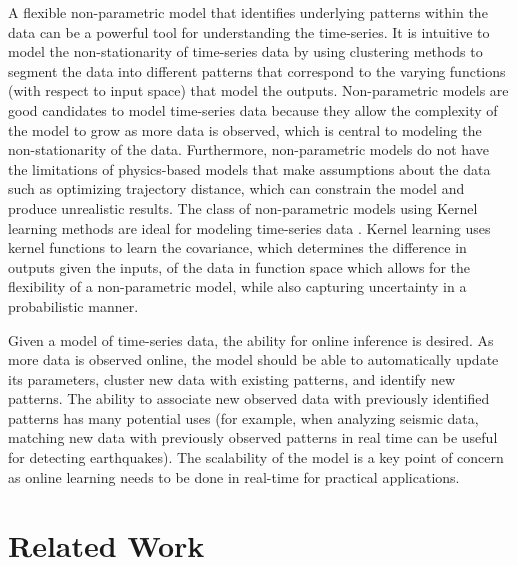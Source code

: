 \documentclass{article}
\begin{document}
A flexible non-parametric model that identifies underlying patterns within the data can be a powerful tool for understanding the time-series. It is intuitive to model the non-stationarity of time-series data by using clustering methods to segment the data into different patterns that correspond to the varying functions (with respect to input space) that model the outputs. Non-parametric models are good candidates to model time-series data because they allow the complexity of the model to grow as more data is observed, which is central to modeling the non-stationarity of the data. Furthermore, non-parametric models do not have the limitations of physics-based models that make assumptions about the data such as optimizing trajectory distance, which can constrain the model and produce unrealistic results. The class of non-parametric models using Kernel learning methods are ideal for modeling time-series data \citep{GPML}. Kernel learning uses kernel functions to learn the covariance, which determines the difference in outputs given the inputs, of the data in function space which allows for the flexibility of a non-parametric model, while also capturing uncertainty in a probabilistic manner. 

Given a model of time-series data, the ability for online inference is desired. As more data is observed online, the model should be able to automatically update its parameters, cluster new data with existing patterns, and identify new patterns. The ability to associate new observed data with previously identified patterns has many potential uses (for example, when analyzing seismic data, matching new data with previously observed patterns in real time can be useful for detecting earthquakes). The scalability of the model is a key point of concern as online learning needs to be done in real-time for practical applications. 

\section{Related Work} 
 
\end{document}
